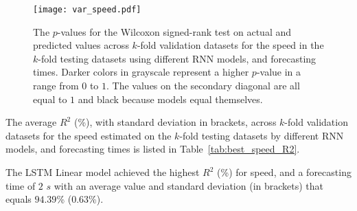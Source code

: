 \begin{figure}[!ht]
	\centering
	\texttt{[image: var\_speed.pdf]}
	\caption{The $p$-values for the Wilcoxon signed-rank test on actual and predicted values across $k$-fold validation datasets for the speed in the $k$-fold testing datasets using different RNN models, and forecasting times. Darker colors in grayscale represent a higher $p$-value in a range from $0$ to $1$. The values on the secondary diagonal are all equal to $1$ and black because models equal themselves.}
	\label{fig:var_speed}
\end{figure}

The average $R^{2}$ (\%), with standard deviation in brackets, across $k$-fold validation datasets for the speed estimated on the $k$-fold testing datasets by different RNN models, and forecasting times is listed in Table~\ref{tab:best_speed_R2}.

\begin{table}[!ht]
	\centering
	\caption{The average $R^{2}$ (\%), with standard deviation in brackets, across $k$-fold validation datasets for the speed estimated on the $k$-fold testing datasets by different RNN models, and forecasting times.}
	\label{tab:best_speed_R2}
\end{table}

The LSTM Linear model achieved the highest $R^{2}$ (\%) for speed, and a forecasting time of $2$ $s$ with an average value and standard deviation (in brackets) that equals $94.39$\% ($0.63$\%).

